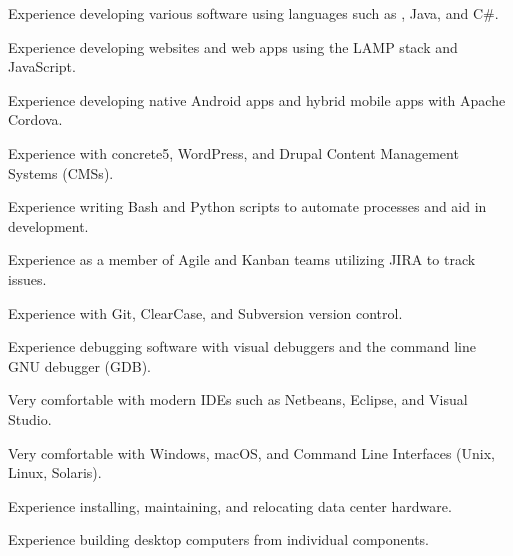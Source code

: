 \begin{itemize*}
  \item Experience developing various software using languages such as \CPP, Java, and C\#.
  \item Experience developing websites and web apps using the LAMP stack and JavaScript.
  \item Experience developing native Android apps and hybrid mobile apps with Apache Cordova.
  \item Experience with concrete5, WordPress, and Drupal Content Management Systems (CMSs).
  \item Experience writing Bash and Python scripts to automate processes and aid in development.
  \item Experience as a member of Agile and Kanban teams utilizing JIRA to track issues.
  \item Experience with Git, ClearCase, and Subversion version control.
  \item Experience debugging software with visual debuggers and the command line GNU debugger (GDB).
  \item Very comfortable with modern IDEs such as Netbeans, Eclipse, and Visual Studio.
  \item Very comfortable with Windows, macOS, and Command Line Interfaces (Unix, Linux, Solaris).
  \item Experience installing, maintaining, and relocating data center hardware.
  \item Experience building desktop computers from individual components.
\end{itemize*}


